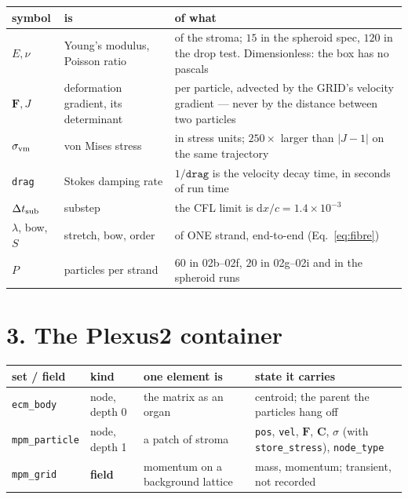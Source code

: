 \documentclass[10pt,a4paper]{article}
\newcommand{\code}[1]{\texttt{#1}}
\begin{document}
\smallskip
{\small\begin{tabular}{@{}llp{8.6cm}@{}}\toprule
symbol & is & of what\\\midrule
$E,\nu$ & Young's modulus, Poisson ratio & of the stroma; $15$ in the spheroid spec, $120$ in the drop
  test. Dimensionless: the box has no pascals\\
$\mathbf F,J$ & deformation gradient, its determinant & per particle, advected by the GRID's velocity
  gradient --- never by the distance between two particles\\
$\sigma_{\rm vm}$ & von Mises stress & in stress units; $250\times$ larger than $|J-1|$ on the same
  trajectory\\
\code{drag} & Stokes damping rate & $1/\code{drag}$ is the velocity decay time, in seconds of run time\\
$\Delta t_{\rm sub}$ & substep & the CFL limit is $\mathrm{d}x/c=1.4\times10^{-3}$\\
$\lambda$, bow, $S$ & stretch, bow, order & of ONE strand, end-to-end (Eq.~\ref{eq:fibre})\\
$P$ & particles per strand & $60$ in 02b--02f, $20$ in 02g--02i and in the spheroid runs\\
\bottomrule\end{tabular}}

\section*{3.\; The Plexus2 container}

\begin{center}\small
\begin{tabular}{@{}llll@{}}\toprule
\textbf{set / field} & \textbf{kind} & \textbf{one element is} & \textbf{state it carries}\\\midrule
\code{ecm\_body}   & node, depth 0 & the matrix as an organ & centroid; the parent the particles hang
  off\\
\quad\code{mpm\_particle} & node, depth 1 & a patch of stroma & \code{pos}, \code{vel}, $\mathbf F$,
  $\mathbf C$, $\sigma$ (with \code{store\_stress}), \code{node\_type}\\
\code{mpm\_grid}   & \textbf{field} & momentum on a background lattice & mass, momentum; transient,
  not recorded\\
\bottomrule\end{tabular}
\end{center}
\end{document}
